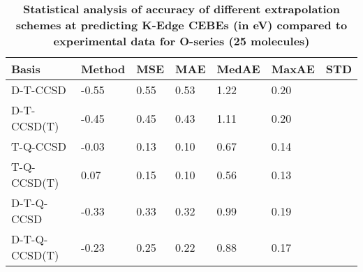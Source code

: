 \begin{table}
  \caption{\textbf{Statistical analysis of accuracy of different extrapolation schemes at predicting K-Edge CEBEs (in eV) compared to experimental data for O-series (25 molecules)}}
  \begin{tabular}{l l l l l l l }
    \toprule
    \textbf{Basis} & \textbf{Method} & \textbf{MSE} & \textbf{MAE} & \textbf{MedAE} & \textbf{MaxAE} & \textbf{STD} \\ 
    \midrule
    D-T-CCSD & -0.55 & 0.55 & 0.53 & 1.22 & 0.20 \\ 
    D-T-CCSD(T) & -0.45 & 0.45 & 0.43 & 1.11 & 0.20 \\ 
    T-Q-CCSD & -0.03 & 0.13 & 0.10 & 0.67 & 0.14 \\ 
    T-Q-CCSD(T) & 0.07 & 0.15 & 0.10 & 0.56 & 0.13 \\ 
    D-T-Q-CCSD & -0.33 & 0.33 & 0.32 & 0.99 & 0.19 \\ 
    D-T-Q-CCSD(T) & -0.23 & 0.25 & 0.22 & 0.88 & 0.17 \\ 
    \bottomrule
  \end{tabular}
\end{table}
